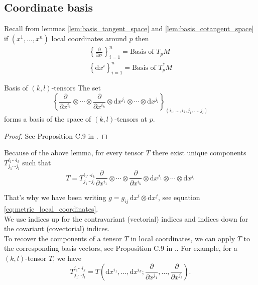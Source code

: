 \subsection{Coordinate basis}

Recall from lemmas \ref{lem:basis_tangent_space} and \ref{lem:basis_cotangent_space} if $(x^1, \ldots, x^n)$ local coordinates around $p$ then
\begin{align*}
    \left\{ \frac{\partial}{\partial x^i} \right\}_{i=1}^{n} = \text{Basis of } T_p M\\
    \left\{ \mathrm{d}x^i \right\}_{i=1}^{n} = \text{Basis of } T_p^* M
\end{align*}
\begin{colorlem}{Basis of $(k,l)$-tensors}{}
The set
\[
\left\{ \frac{\partial}{\partial x^{i_1}} \otimes \cdots \otimes \frac{\partial}{\partial x^{i_k}} \otimes \mathrm{d}x^{j_1} \otimes \cdots \otimes \mathrm{d}x^{j_l} \right\}_{(i_1, \ldots, i_k, j_1, \ldots, j_l)}
\]
forms a basis of the space of $(k, l)$-tensors at $p$.
\end{colorlem}
\begin{proof}
See Proposition C.9 in \cite{tsakanikas2024dg2}.
\end{proof}

Because of the above lemma, for every tensor $T$ there exist unique components $T^{i_1 \cdots i_k}_{j_1 \cdots j_l}$ such that
\[
T = T^{i_1 \cdots i_k}_{j_1 \cdots j_l} \frac{\partial}{\partial x^{i_1}} \otimes \cdots \otimes \frac{\partial}{\partial x^{i_k}} \otimes \mathrm{d}x^{j_1} \otimes \cdots \otimes \mathrm{d}x^{j_l}
\]

That's why we have been writing $g = g_{ij} \, \mathrm{d}x^i \otimes \mathrm{d}x^j$, see equation \eqref{eq:metric_local_coordinates}. \\

We use indices up for the contravariant (vectorial) indices and indices down for the covariant (covectorial) indices.\\

To recover the components of a tensor $T$ in local coordinates, we can apply $T$ to the corresponding basis vectors, see Proposition C.9 in \cite{tsakanikas2024dg2}.. For example, for a $(k,l)$-tensor $T$, we have
\begin{equation}
    \label{eq:tensor_components}
    T^{i_1 \cdots i_k}_{j_1 \cdots j_l} = T\left( \mathrm{d}x^{i_1}, \ldots, \mathrm{d}x^{i_k}; \frac{\partial}{\partial x^{j_1}}, \ldots, \frac{\partial}{\partial x^{j_l}} \right).
\end{equation}





